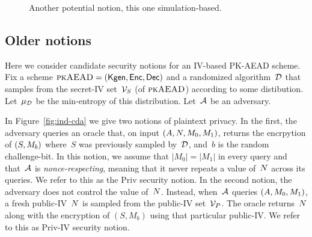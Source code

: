 \begin{figure}
\begin{center}
\caption{Another potential notion, this one simulation-based.}
\label{fig:pkaead-notions-2}
\end{center}
\end{figure}
\fi

\subsection{Older notions}
Here we consider candidate security notions for an IV-based PK-AEAD scheme.  Fix a scheme $\textsc{pkAEAD}=(\mathsf{Kgen},{\mathsf{Enc}},{\mathsf{Dec}})$ and a randomized algorithm~${\cal D}$ that samples from the secret-IV set~$\mathcal{V}_S$ (of $\textsc{pkAEAD}$) according to some distibution.  Let~$\mu_{\cal D}$ be the min-entropy of this distribution.  Let~${\cal A}$ be an adversary.  

In Figure~\ref{fig:ind-cda} we give two notions of plaintext privacy.  In the first, the adversary queries an oracle that, on input $(A,N,M_0,M_1)$, returns the encrpytion of $(S,M_b)$ where~$S$ was previously sampled by~${\cal D}$, and~$b$ is the random challenge-bit.  In this notion, we assume that $|M_0|=|M_1|$ in every query and that~${\cal A}$ is \emph{nonce-respecting}, meaning that it never repeats a value of~$N$ across its queries.  We refer to this as the Priv security notion.
In the second notion, the adversary does not control the value of~$N$.  Instead, when~${\cal A}$ queries $(A,M_0,M_1)$, a fresh public-IV~$N$ is sampled from the public-IV set~$\mathcal{V}_P$.  The oracle returns~$N$ along with the encryption of $(S,M_b)$ using that particular public-IV.  We refer to this as Priv-IV security notion.

